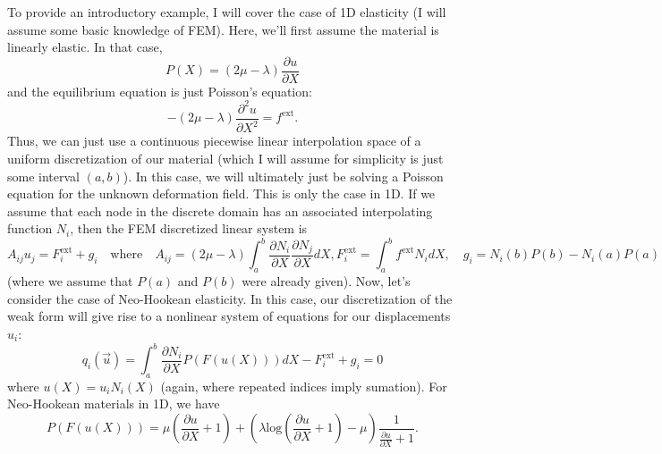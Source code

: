To provide an introductory example, I will cover the case of 1D elasticity (I will assume some basic knowledge of FEM). Here, we'll first assume the material is linearly elastic. In that case,
\begin{equation*}
P(X) = \left( 2 \mu - \lambda \right) \frac{\partial u}{\partial X}
\end{equation*}
and the equilibrium equation is just Poisson's equation:
\begin{equation*}
-\left( 2 \mu - \lambda \right) \frac{\partial^2 u}{\partial X^2} = f^{\text{ext}}.
\end{equation*}
Thus, we can just use a continuous piecewise linear interpolation space of a uniform discretization of our material (which I will assume for simplicity is just some interval $(a,b)$). In this case, we will ultimately just be solving a Poisson equation for the unknown deformation field. This is only the case in 1D. If we assume that each node in the discrete domain has an associated interpolating function $N_i$, then the FEM discretized linear system is
\begin{subequations}
\begin{equation*}
A_{ij} u_j = F^{\text{ext}}_i + g_i \quad \text{where} \quad A_{ij} = \left( 2 \mu - \lambda \right) \int_a^b \frac{\partial N_i}{\partial X}\frac{\partial N_j}{\partial X} dX,
\end{equation*}
\begin{equation*}
F^{\text{ext}}_i = \int_a^b f^{\text{ext}} N_i dX, \quad g_i = N_i(b) P(b) - N_i(a) P(a)
\end{equation*}
\end{subequations}
(where we assume that $P(a)$ and $P(b)$ were already given). Now, let's consider the case of Neo-Hookean elasticity. In this case, our discretization of the weak form will give rise to a nonlinear system of equations for our displacements $u_i$:
\begin{equation*}
q_i \left( \vec{u} \right) = \int_a^b \frac{\partial N_i}{\partial X} P(F(u(X))) dX - F^{\text{ext}}_i + g_i = 0
\end{equation*}
where $u(X) = u_i N_i(X)$ (again, where repeated indices imply sumation). For Neo-Hookean materials in 1D, we have
\begin{equation*}
P(F(u(X))) = \mu \left( \frac{\partial u}{\partial X} + 1 \right) + \left( \lambda \text{log} \left( \frac{\partial u}{\partial X} + 1 \right) - \mu \right) \frac{1}{\frac{\partial u}{\partial X} + 1}.
\end{equation*}
